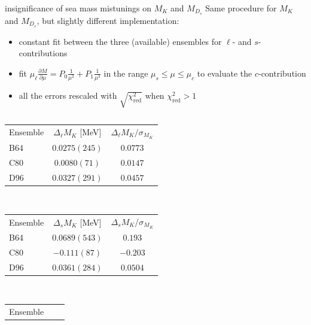 \documentclass[xcolor={dvipsnames,table}]{beamer}
\begin{document}
\begin{frame}{insignificance of sea mass mistunings on $M_K$ and $M_{D_s}$}
  Same procedure for $M_K$ and $M_{D_s}$, but slightly different implementation:
  \begin{itemize}
    \item constant fit between the three (available) ensembles for $\ell$- and $s$-contributions
    \item fit $\mu_\ell  \frac{\partial M }{\partial\mu} = P_0\frac{1}{\mu^2}+P_1\frac{1}{\mu^3}$ in the range $\mu_s\le\mu\le\mu_c$ to evaluate the $c$-contribution
    \item all the errors rescaled with $\sqrt{\chi^2_\mathrm{red}}$ when $\chi^2_\mathrm{red}>1$
  \end{itemize}
  \begin{columns}
    \begin{column}{0.5\textwidth}
      \begin{center}
        \begin{tabular}{l|c|c}
          Ensemble
              & $\Delta_{\ell}M_{K}$ [MeV]
              & $\Delta_{\ell}M_{K}/\sigma_{M_{K}}$            \\
          B64 & $0.0275(245)$                       & $0.0773$ \\
          C80 & $0.0080(71)$                        & $0.0147$ \\
          D96 & $0.0327(291)$                       & $0.0457$ \\
        \end{tabular}
        \vspace*{0.2cm}\,
        \\
        \begin{tabular}{l|c|c}
          Ensemble
              & $\Delta_{s}M_{K}$ [MeV]
              & $\Delta_{s}M_{K}/\sigma_{M_{K}}$            \\
          B64 & $0.0689(543)$                    & $0.193$  \\
          C80 & $-0.111(87)$                     & $-0.203$ \\
          D96 & $0.0361(284)$                    & $0.0504$ \\
        \end{tabular}
        \vspace*{0.2cm}\,
        \\
        \begin{tabular}{l|c|c}
          Ensemble

\end{tabular}
\end{center}
\end{column}
\end{columns}
\end{frame}
\end{document}
